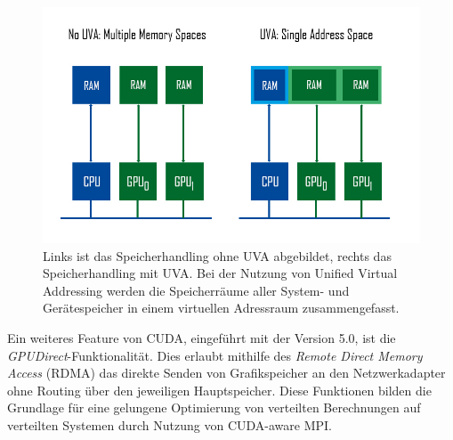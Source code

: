 \documentclass[doktyp=semarbeit, sprache=german]{TUBAFarbeiten}
\begin{document}
\begin{figure}
	\centering
	\captionsetup{justification=centering} 
	\includegraphics[width=1.0\textwidth]{images/CUDAUVA.jpg}
	\caption{Links ist das Speicherhandling ohne UVA abgebildet, rechts das Speicherhandling mit UVA. Bei der Nutzung von Unified Virtual Addressing werden die Speicherräume aller System- und Gerätespeicher in einem virtuellen Adressraum zusammengefasst.}
	\label{img:cudauval}
\end{figure}
Ein weiteres Feature von CUDA, eingeführt mit der Version 5.0, ist die \textit{GPUDirect}-Funktionalität. Dies erlaubt mithilfe des \textit{Remote Direct Memory Access} (RDMA) das direkte Senden von Grafikspeicher an den Netzwerkadapter ohne Routing über den jeweiligen Hauptspeicher. 
Diese Funktionen bilden die Grundlage für eine gelungene Optimierung von verteilten Berechnungen auf verteilten Systemen durch Nutzung von CUDA-aware MPI.
\end{document}
